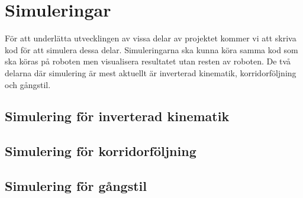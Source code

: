 \documentclass[a4paper,titlepage,12pt]{article}
\begin{document}
	\section{Simuleringar}
	För att underlätta utvecklingen av vissa delar av projektet kommer vi att skriva
	kod för att simulera dessa delar. Simuleringarna ska kunna köra samma kod som ska
	köras på roboten men visualisera resultatet utan resten av roboten. De två
	delarna där simulering är mest aktuellt är inverterad kinematik, korridorföljning 
	och gångstil.

	\subsection{Simulering för inverterad kinematik}
	
	
	\subsection{Simulering för korridorföljning}
	
	\subsection{Simulering för gångstil}
\end{document}
